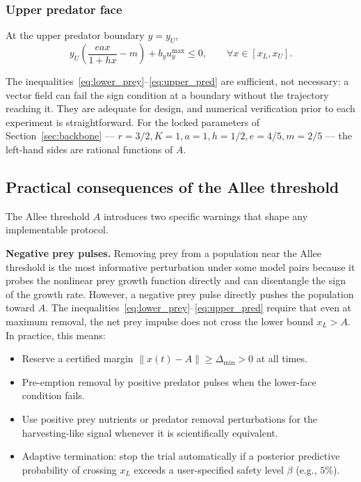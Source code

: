 \subsubsection*{Upper predator face}

At the upper predator boundary \(y = y_U\),
\begin{equation}
\boxed{
y_U \left(\frac{e a x}{1 + h x} - m\right) + b_y u_y^{\max} \le 0,\qquad
\forall x \in [x_L, x_U] }.
\label{eq:upper_pred}
\end{equation}

The inequalities~\eqref{eq:lower_prey}--\eqref{eq:upper_pred} are sufficient, not necessary: a vector field can fail the sign condition at a boundary without the trajectory reaching it. They are adequate for design, and numerical verification prior to each experiment is straightforward. For the locked parameters of Section~\ref{sec:backbone} --- \(r = 3/2, K = 1, a = 1, h = 1/2, e = 4/5, m = 2/5\) --- the left-hand sides are rational functions of \(A\).


\subsection{Practical consequences of the Allee threshold}

The Allee threshold \(A\) introduces two specific warnings that shape any implementable protocol.

\textbf{Negative prey pulses.} Removing prey from a population near the Allee threshold is the most informative perturbation under some model pairs because it probes the nonlinear prey growth function directly and can disentangle the sign of the growth rate. However, a negative prey pulse directly pushes the population toward \(A\). The inequalities~\eqref{eq:lower_prey}--\eqref{eq:upper_pred} require that even at maximum removal, the net prey impulse does not cross the lower bound \(x_L > A\). In practice, this means:

\begin{itemize}
\item Reserve a certified margin \(\|x(t) - A\| \ge \Delta_{\text{min}} > 0\) at all times.
\item Pre-emption removal by positive predator pulses when the lower-face condition fails.
\item Use positive prey nutrients or predator removal perturbations for the harvesting-like signal whenever it is scientifically equivalent.
\item Adaptive termination: stop the trial automatically if a posterior predictive probability of crossing \(x_L\) exceeds a user-specified safety level \(\beta\) (e.g., \(5\%\)).
\end{itemize}

